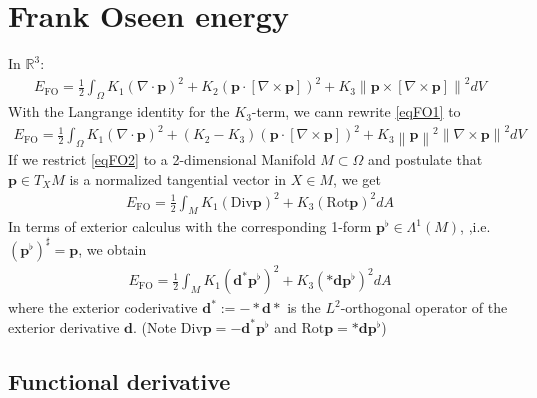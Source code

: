 \documentclass[a4paper,11pt]{scrartcl}
\newcommand{\exd}{\mathbf{d}}
\newcommand{\excod}{\exd^{*}} %
\newcommand{\Div}{\text{Div}}
\newcommand{\Rot}{\text{Rot}}
\newcommand{\R}{\mathds{R}}
\newcommand{\M}{M}
\newcommand{\dA}{dA}
\newcommand{\p}{\mathbf{p}}
\newcommand{\pfl}{\mathbf{p}^{\flat}}
\newcommand{\EOS}{E_{\text{FO}}}
\begin{document}
\tableofcontents

\section{Frank Oseen energy}

In \( \R^{3} \):
\begin{align}\label{eqFO1}
  \EOS = \frac{1}{2}\int_{\Omega} K_{1}\left( \nabla\cdot\p \right)^{2} 
                        + K_{2}\left( \p\cdot\left[ \nabla\times\p \right] \right)^{2}
                        + K_{3}\left\| \p\times\left[ \nabla\times\p \right] \right\|^{2} dV
\end{align}
With the Langrange identity for the \( K_{3} \)-term, we cann rewrite \eqref{eqFO1} to
\begin{align}\label{eqFO2}
  \EOS = \frac{1}{2}\int_{\Omega} K_{1}\left( \nabla\cdot\p \right)^{2} 
                        + (K_{2}-K_{3})\left( \p\cdot\left[ \nabla\times\p \right] \right)^{2}
                        + K_{3}\left\| \p \right\|^{2}\left\| \nabla\times\p \right\|^{2} dV
\end{align}
If we restrict \eqref{eqFO2} to a 2-dimensional Manifold \( \M\subset\Omega \) 
and postulate that \( \p\in T_{X}\M \) is a normalized tangential vector in \( X\in\M \), we get
\begin{align}
  \EOS = \frac{1}{2} \int_{\M} K_{1}\left( \Div\p \right)^{2} + K_{3}\left( \Rot \p \right)^{2} \dA 
\end{align}
In terms of exterior calculus with the corresponding 1-form \( \pfl\in\Lambda^{1}(M) \), 
,i.e. \( \left( \pfl \right)^{\sharp} = \p\), we obtain
\begin{align}
  \EOS = \frac{1}{2} \int_{\M} K_{1}\left( \excod\pfl \right)^{2} + K_{3}\left( *\exd \pfl \right)^{2} \dA
\end{align}
where the exterior coderivative \( \excod := -* \exd * \) is the \( L^{2} \)-orthogonal operator of the exterior derivative \( \exd \). 
(Note \( \Div\p = -\excod\pfl \) and \( \Rot\p = *\exd\pfl \)) 

  \subsection{Functional derivative}
  
\end{document}
